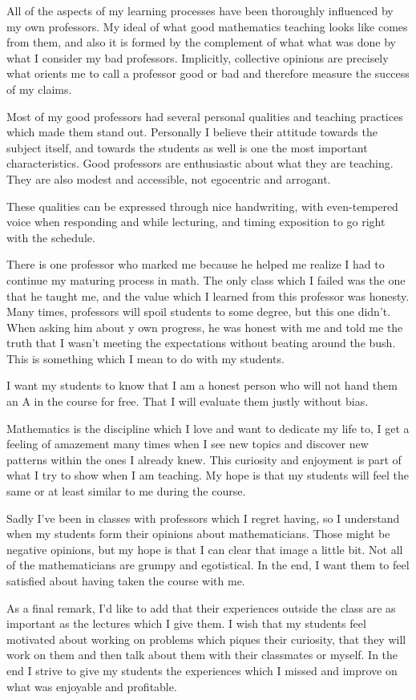 \documentclass[a4paper,12pt,final]{book}
\begin{document}
All of the aspects of my learning processes have been thoroughly influenced by my own professors. My ideal of what good mathematics teaching looks like comes from them, and also it is formed by the complement of what what was done by what I consider my bad professors. Implicitly, collective opinions are precisely what orients me to call a professor good or bad and therefore measure the success of my claims.\par 
Most of my good professors had several personal qualities and teaching practices which made them stand out. Personally I believe their attitude towards the subject itself, and towards the students as well is one the most important characteristics. Good professors are enthusiastic about what they are teaching. They are also modest and accessible, not egocentric and arrogant.\par
These qualities can be expressed through nice handwriting, with even-tempered voice when responding and while lecturing, and timing exposition to go right with the schedule.\par
There is one professor who marked me because he helped me realize I had to continue my maturing process in math. The only class which I failed was the one that he taught me, and the value which I learned from this professor was honesty. Many times, professors will spoil students to some degree, but this one didn't. When asking him about y own progress, he was honest with me and told me the truth that I wasn't meeting the expectations without beating around the bush. This is something which I mean to do with my students.\par 
I want my students to know that I am a honest person who will not hand them an A in the course for free. That I will evaluate them justly without bias.\par 
Mathematics is the discipline which I love and want to dedicate my life to, I get a feeling of amazement many times when I see new topics and discover new patterns within the ones I already knew. This curiosity and enjoyment is part of what I try to show when I am teaching. My hope is that my students will feel the same or at least similar to me during the course.\par 
Sadly I've been in classes with professors which I regret having, so I understand when my students form their opinions about mathematicians. Those might be negative opinions, but my hope is that I can clear that image a little bit. Not all of the mathematicians are grumpy and egotistical. In the end, I want them to feel satisfied about having taken the course with me.\par 
As a final remark, I'd like to add that their experiences outside the class are as important as the lectures which I give them. I wish that my students feel motivated about working on problems which piques their curiosity, that they will work on them and then talk about them with their classmates or myself. In the end I strive to give my students the experiences which I missed and improve on what was enjoyable and profitable.
\end{document}
